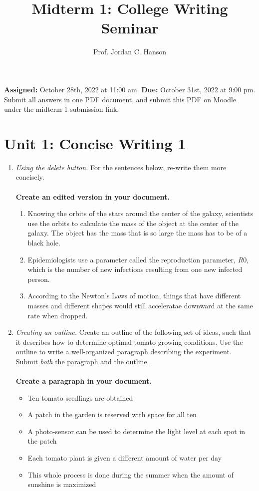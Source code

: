 \documentclass{article}
\begin{document}
\title{Midterm 1: College Writing Seminar}
\author{Prof. Jordan C. Hanson}

\maketitle

\textbf{Assigned:} October 28th, 2022 at 11:00 am.  \textbf{Due:} October 31st, 2022 at 9:00 pm. Submit all answers in one PDF document, and submit this PDF on Moodle under the midterm 1 submission link.

\section{Unit 1: Concise Writing 1}

\begin{enumerate}
\item \textit{Using the delete button.} For the sentences below, re-write them more concisely. \\ \\
\textbf{Create an edited version in your document.}
\begin{enumerate}
\item Knowing the orbits of the stars around the center of the galaxy, scientists use the orbits to calculate the mass of the object at the center of the galaxy.  The object has the mass that is so large the mass has to be of a black hole.
\item Epidemiologists use a parameter called the reproduction parameter, $R0$, which is the number of new infections resulting from one new infected person.
\item According to the Newton's Laws of motion, things that have different masses and different shapes would still acceleratae downward at the same rate when dropped.
\end{enumerate}
\item \textit{Creating an outline.} Create an outline of the following set of ideas, such that it describes how to determine optimal tomato growing conditions.  Use the outline to write a well-organized paragraph describing the experiment. Submit \textit{both} the paragraph and the outline.  \\ \\
\textbf{Create a paragraph in your document.} 
\begin{itemize}
\item Ten tomato seedlings are obtained
\item A patch in the garden is reserved with space for all ten
\item A photo-sensor can be used to determine the light level at each spot in the patch
\item Each tomato plant is given a different amount of water per day
\item This whole process is done during the summer when the amount of sunshine is maximized
\end{itemize}
\end{enumerate}
\end{document}

